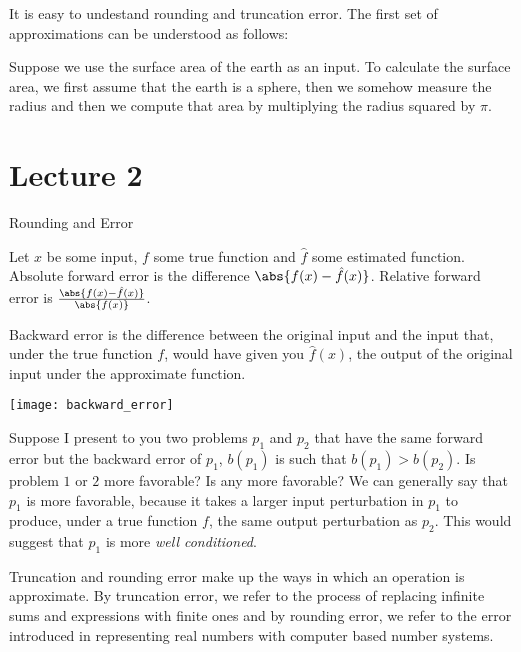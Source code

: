 \documentclass[../main.tex]{subfiles}
\begin{document}
\begin{example}
    It is easy to undestand rounding and truncation error. The first set of approximations can be understood as follows:

    Suppose we use the surface area of the earth as an input. To calculate the surface area, we first assume that the earth
    is a sphere, then we somehow measure the radius and then we compute that area by multiplying the radius squared by $\pi$.
\end{example}
\section{Lecture 2}{Rounding and Error}


\begin{definition}
    Let $x$ be some input, $f$ some true function and $\hat{f}$ some estimated function. Absolute forward error is the difference
    $\abs{f(x) - \hat{f}(x)}$. Relative forward error is $\frac{\abs{f(x) - \hat{f}(x)}}{\abs{f(x)}}$.
\end{definition}

\begin{definition}
    Backward error is the difference between the original input and the input that, under the true function $f$, would have given
    you $\hat{f}(x)$, the output of the original input under the approximate function.
\end{definition}

\begin{center}
    \texttt{[image: backward\_error]}
\end{center}

\begin{remark}
    Suppose I present to you two problems $p_1$ and $p_2$ that have the same forward error but the backward error of $p_1$, $b(p_1)$ is
    such that $b(p_1) > b(p_2)$. Is problem $1$ or $2$ more favorable? Is any more favorable? We can generally say that $p_1$ is more favorable, because it takes a larger input perturbation in $p_1$ to produce, under a true function $f$, the same output perturbation as $p_2$. This would suggest that $p_1$ is more \textit{well conditioned}.
\end{remark}

\begin{remark}
    Truncation and rounding error make up the ways in which an operation is approximate. By truncation error, we refer to the process of replacing infinite sums and expressions with finite ones and by rounding error, we refer to the error introduced in representing real numbers with computer based number systems.
\end{remark}
\end{document}
